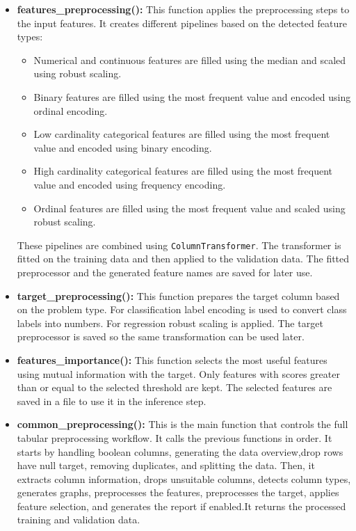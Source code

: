 \documentclass[12pt,a4paper]{report}
\begin{document}
\begin{itemize}
    \item \textbf{features\_preprocessing():}
    This function applies the preprocessing steps to the input features. It creates
    different pipelines based on the detected feature types:
    \begin{itemize}
        \item Numerical and continuous features are filled using the median and scaled
        using robust scaling.
        \item Binary features are filled using the most frequent value and encoded using
        ordinal encoding.
        \item Low cardinality categorical features are filled using the most frequent
        value and encoded using binary encoding.
        \item High cardinality categorical features are filled using the most frequent
        value and encoded using frequency encoding.
        \item Ordinal features are filled using the most frequent value and scaled using
        robust scaling.
    \end{itemize}
    These pipelines are combined using \texttt{ColumnTransformer}. The transformer is
    fitted on the training data and then applied to the validation data. The fitted
    preprocessor and the generated feature names are saved for later use.

    \item \textbf{target\_preprocessing():}
    This function prepares the target column based on the problem type. For
    classification label encoding is used to convert class labels into numbers. For regression robust scaling is applied. The target
    preprocessor is saved so the same transformation can be used later.

    \item \textbf{features\_importance():}
    This function selects the most useful features using mutual information with the target. Only features with scores
    greater than or equal to the selected threshold are kept. The selected features are
    saved in a file to use it in the inference step. 
    \item \textbf{common\_preprocessing():}
    This is the main function that controls the full tabular preprocessing workflow. It
    calls the previous functions in order. It starts by handling boolean columns,
    generating the data overview,drop rows have null target, removing duplicates, and splitting the data. Then, it
    extracts column information, drops unsuitable columns, detects column types,
    generates graphs, preprocesses the features, preprocesses the target, applies feature
    selection, and generates the report if enabled.It returns the processed
    training and validation data.
\end{itemize}
\end{document}
